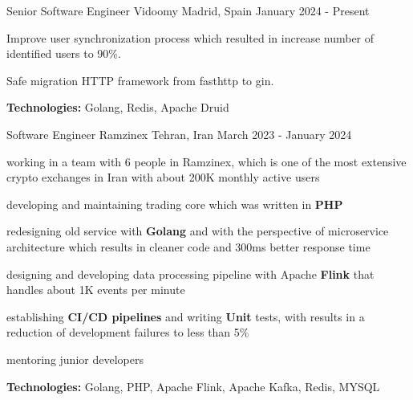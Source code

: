 

\begin{cventries}


  \cventry
    {Senior Software Engineer} %
    {Vidoomy} %
    {Madrid, Spain} %
    {January 2024 - Present} %
    {
      \begin{cvitems} %
        \item Improve user synchronization process which resulted in increase number of identified users to 90\%.
        \item Safe migration HTTP framework from fasthttp to gin.
        \item \textbf{Technologies:} Golang, Redis, Apache Druid
      \end{cvitems}
    }

    
  \cventry
    {Software Engineer} %
    {Ramzinex} %
    {Tehran, Iran} %
    {March 2023 - January 2024} %
    {
      \begin{cvitems} %
        \item working in a team with 6 people in Ramzinex, which is one of the most extensive crypto exchanges in Iran with about 200K monthly active users
        \item developing and maintaining trading core which was written in \textbf{PHP}
        \item redesigning old service with \textbf{Golang} and with the perspective of microservice architecture which results in cleaner code and 300ms better response time
        \item designing and developing data processing pipeline with Apache \textbf{Flink} that handles about 1K events per minute
        \item establishing \textbf{CI/CD pipelines} and writing \textbf{Unit} tests, with results in a reduction of development failures to less than 5\%
        \item mentoring junior developers
        \item \textbf{Technologies:} Golang, PHP, Apache Flink, Apache Kafka, Redis, MYSQL
      \end{cvitems}
    }


\end{cventries}
